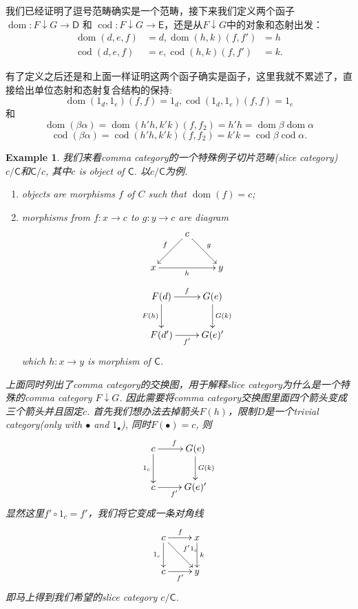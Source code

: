 \documentclass{article}
\newtheorem{example}[theorem]{Example}
\newcommand*{\cat}[1]{\textsf{#1}\xspace}
\newcommand{\sC}{\mathsf{C}}
\newcommand{\sD}{\mathsf{D}}
\newcommand{\sE}{\mathsf{E}}
\newcommand{\al}{\alpha}
\newcommand{\be}{\beta}
\newcommand*{\xfunc}[4]{{#2}\colon{#3}{#1}{#4}}
\newcommand*{\func}[3]{\xfunc{\to}{#1}{#2}{#3}}
\newcommand*{\qty}[1]{\left({#1}\right)}
\DeclareMathOperator{\dom}{dom}
\DeclareMathOperator{\cod}{cod}
\begin{document}
我们已经证明了逗号范畴确实是一个范畴，接下来我们定义两个函子$\func{\dom}{F \downarrow G}{\sD}$ 和 $\func{\cod}{F \downarrow G}{\sE}$，还是从$F \downarrow G$中的对象和态射出发：
\begin{align*}
	\dom\qty{d,e,f} &= d, \dom\qty{h,k}\qty{f,f'} \;\;= h \\
	\cod\qty{d,e,f} &= e, \cod\qty{h,k}\qty{f,f'} \quad= k.
\end{align*}

有了定义之后还是和上面一样证明这两个函子确实是函子，这里我就不累述了，直接给出单位态射和态射复合结构的保持:\[\dom\qty{1_{d},1_{e}}\qty{f,f} = 1_d,\cod\qty{1_{d},1_{e}}\qty{f,f} =1_e \]和\[\dom(\be \al) = \dom\qty{h'  h,k'  k}\qty{f,f_2} =h'
	 h = \dom\be  \dom\al\] \[\cod(\be \al) = \cod \qty{h' h,k' k}\qty{f,f_2}=  k'
	 k = \cod\be\cod\al.\]
	 
\begin{example}
\rm 我们来看comma category的一个特殊例子切片范畴(slice category) $c/\sC$和$\sC/c$, 其中$c$ is object of $\cat{C}$. 以$c/\cat{C}$为例.
\begin{enumerate}
	\item objects are morphisms $f$ of $C$ such that $\dom(f) = c$; 
	\item morphisms from $f:x \to c$ to $g: y \to c$ are diagram
	\[ \xymatrix{&c\ar[dr]^g
		\ar[dl]_f& \\ x \ar[rr]_h && y } \] \[\xymatrix{
					F(d) \ar[d]_{F(h)} \ar[r]^{f} & G(e)\ar[d]^{G(k)}  \\
			F(d')\ar[r]_{f'} &G(e)'}\]
	which $h: x\to y$ is morphism of $\cat{C}$.		
\end{enumerate}

上面同时列出了comma category的交换图，用于解释slice category为什么是一个特殊的comma category $F \downarrow G$. 因此需要将comma category交换图里面四个箭头变成三个箭头并且固定$c$. 首先我们想办法去掉箭头$F(h)$，限制$D$是一个trivial category(only with $\bullet$ and $1_\bullet$), 同时$F(\bullet) = c$, 则 \[\xymatrix{c \ar[d]_{1_c} \ar[r]^{f} & G(e)\ar[d]^{G(k)}  \\c\ar[r]_{f'} &G(e)'}\] 显然这里$f' \circ 1_c = f'$，我们将它变成一条对角线\[\xymatrix{c \ar[d]_{1_c} \ar[r]^{f} \ar[rd]^{f'1_c} & x\ar[d]^{k}  \\c\ar[r]_{f'} &y}\] 即马上得到我们希望的slice category $c/\cat{C}$.  
\end{example}
\end{document}
